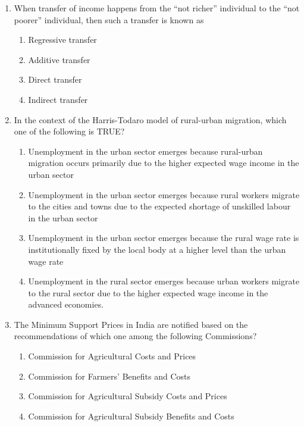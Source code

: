 \documentclass{article}
\begin{document}
\begin{enumerate}[leftmargin=*, start=27, label=Q.\arabic*.]
    \item When transfer of income happens from the “not richer” individual to the “not poorer” individual, then such a transfer is known as
    
    \begin{multicols}{4}
        \begin{enumerate}
            \item Regressive transfer
            \item Additive transfer
            \item Direct transfer
            \item Indirect transfer
        \end{enumerate}
    \end{multicols}

    \item In the context of the Harris-Todaro model of rural-urban migration, which one of the following is TRUE?

    \begin{enumerate}
        \item Unemployment in the urban sector emerges because rural-urban migration occurs primarily due to the higher expected wage income in the urban sector
        \item Unemployment in the urban sector emerges because rural workers migrate to the cities and towns due to the expected shortage of unskilled labour in the urban sector
        \item Unemployment in the urban sector emerges because the rural wage rate is institutionally fixed by the local body at a higher level than the urban wage rate
        \item Unemployment in the rural sector emerges because urban workers migrate to the rural sector due to the higher expected wage income in the advanced economies.
    \end{enumerate}

    \item The Minimum Support Prices in India are notified based on the recommendations of which one among the following Commissions?
    
    \begin{enumerate}
        \item Commission for Agricultural Costs and Prices
        \item Commission for Farmers’ Benefits and Costs
        \item Commission for Agricultural Subsidy Costs and Prices
        \item Commission for Agricultural Subsidy Benefits and Costs
    \end{enumerate}


\end{enumerate}
\end{document}
